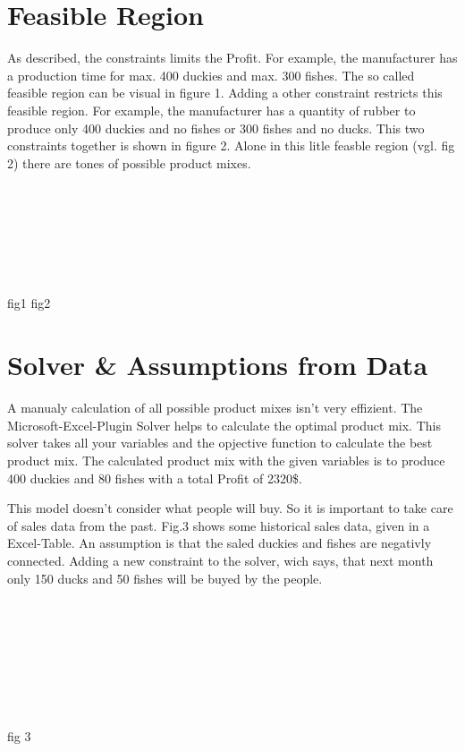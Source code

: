\documentclass{article}
\begin{document}
\begin{multicols}{2}
\section{Feasible Region}
As described, the constraints limits the Profit. For example, the manufacturer has a production time for max. 400 duckies and max. 300 fishes. The so called feasible region can be visual in figure 1. Adding a other constraint restricts this feasible region. For example, the manufacturer has a quantity of rubber to produce only 400 duckies and no fishes or 300 fishes and no ducks. This two constraints together is shown in figure 2. Alone in this litle feasble region (vgl. fig 2) there are tones of possible product mixes. \\ \\ \\ \\ \\ \\ \\ \\

fig1        fig2


\section{Solver \& Assumptions from Data}
A manualy calculation of all possible product mixes isn't very effizient. The Microsoft-Excel-Plugin \glqq Solver\grqq{} helps to calculate the optimal product mix. This solver takes all your variables and the opjective function to calculate the best product mix. The calculated product mix with the given variables is to produce 400 duckies and 80 fishes with a total Profit of 2320\$.

This model doesn't consider what people will buy. So it is important to take care of sales data from the past. Fig.3 shows some historical sales data, given in a Excel-Table. An assumption is that the saled duckies and fishes are negativly connected. Adding a new constraint to the solver, wich says, that next month only 150 ducks and 50 fishes will be buyed by the people. \\ \\ \\ \\ \\ \\ \\ \\ \\

fig 3


\end{multicols}
\end{document}
